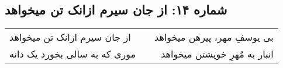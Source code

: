 \begin{center}
\section*{شماره ۱۴: از جان سیرم ازانک تن میخواهد}
\label{sec:014}
\begin{longtable}{l p{0.5cm} r}
از جان سیرم ازانک تن میخواهد
&&
بی یوسفِ مهر، پیرهن میخواهد
\\
موری که به سالی بخورد یک دانه
&&
انبار به مُهرِ خویشتن میخواهد
\\
\end{longtable}
\end{center}
